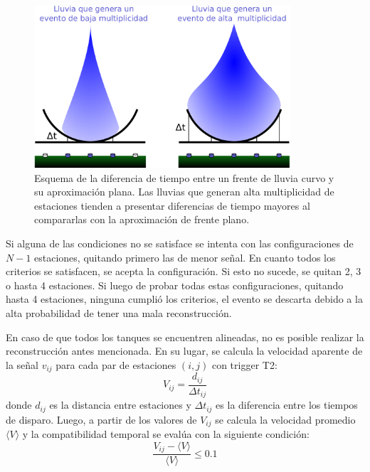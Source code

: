 	\begin{figure}[ht]
	\begin{center}
	\includegraphics[width=0.85\textwidth]{fig/seleccionAuger/plano_vs_curvo.pdf}
	\caption{Esquema de la diferencia de tiempo entre un frente de lluvia curvo y su aproximación plana. 
	Las lluvias que generan alta multiplicidad de estaciones tienden a presentar diferencias de tiempo mayores al compararlas con la aproximación de frente plano.}
	\label{fig:planeFrontAprox}
	\end{center}
	\end{figure}
	Si alguna de las condiciones no se satisface se intenta con las configuraciones de $N-1$ estaciones, quitando primero las de menor señal. 
	En cuanto todos los criterios se satisfacen, se acepta la configuración. Si esto no sucede, se quitan 2, 3 o hasta 4 estaciones.
	Si luego de probar todas estas configuraciones, quitando hasta 4 estaciones, ninguna cumpli\'o los criterios, el evento se descarta debido a la alta probabilidad de tener una mala reconstrucción.
	
	En caso de que todos los tanques se encuentren alineadas, no es posible realizar la reconstrucción antes mencionada.
	En su lugar, se calcula la velocidad aparente de la señal $v_{ij}$ para cada par de estaciones $(i,j)$ con trigger T2:
	\begin{equation}
	 V_{ij}=\frac{d_{ij}}{\Delta t_{ij}}
	\end{equation}
	donde $d_{ij}$ es la distancia entre estaciones y $\Delta t_{ij}$ es la diferencia entre los tiempos de disparo.
	Luego, a partir de los valores de $V_{ij}$ se calcula la velocidad promedio $\langle V\rangle$ y la compatibilidad temporal se eval\'ua con la siguiente condición:
	\begin{equation}
	 \frac{V_{ij}-\langle V\rangle}{\langle V\rangle}\leq0.1
	\end{equation}
	
